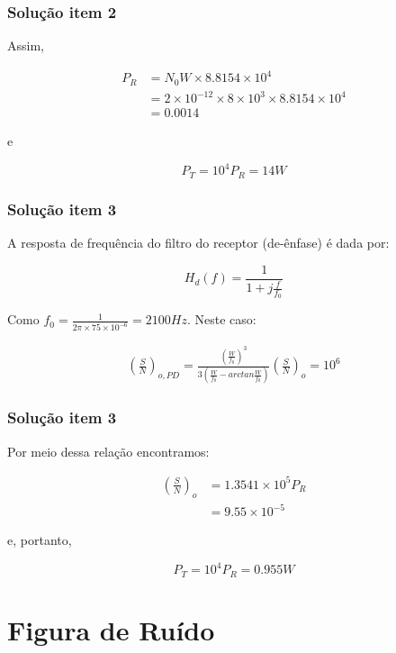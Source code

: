 \documentclass{beamer}
\begin{document}
\begin{frame}
  \frametitle{Solução item 2}

  Assim, 

\begin{align*}
  P_R &= N_0W \times 8.8154 \times 10^4 \\
     &= 2 \times 10^{-12} \times 8 \times 10^3 \times 8.8154 \times 10^4 \\
     &= 0.0014
\end{align*}

e

$$P_T = 10^4 P_R = 14 W$$

\end{frame}


\begin{frame}
  \frametitle{Solução item 3}

  A resposta de frequência do filtro do receptor (de-ênfase) é dada por: 


$$H_d(f) = \frac{1}{1+j \frac{f}{f_0}}$$

Como $f_0 = \frac{1}{2 \pi \times 75 \times 10^{-6}} = 2100Hz$. Neste caso: 

\begin{align*}
\left(\frac{S}{N}\right)_{o,PD} =  \frac{\left(\frac{W}{f_0} \right)^3}{3 \left( \frac{W}{f_0} - arctan \frac{W}{f_0} \right)} \left(\frac{S}{N}\right)_{o} = 10^6 
\end{align*}



\end{frame}

\begin{frame}
  \frametitle{Solução item 3}

  Por meio dessa relação encontramos: 

\begin{align*}
\left(\frac{S}{N}\right)_{o} &= 1.3541 \times 10^5
P_R \\
&= 9.55 \times 10^{-5} 
\end{align*}


e, portanto, 

$$P_T = 10^4P_R = 0.955W$$

\end{frame}

\section{Figura de Ruído}
\end{document}
